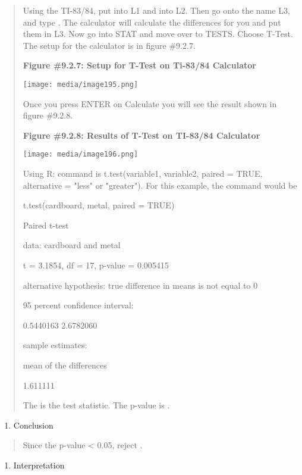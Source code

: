 \documentclass[]{book}
\providecommand{\tightlist}{%
  \setlength{\itemsep}{0pt}\setlength{\parskip}{0pt}}
\begin{document}
\begin{quote}
Using the TI-83/84, put into L1 and into L2. Then go onto the name L3, and type . The calculator will calculate the differences for you and put them in L3. Now go into STAT and move over to TESTS. Choose T-Test. The setup for the calculator is in figure \#9.2.7.

\textbf{Figure \#9.2.7: Setup for T-Test on Ti-83/84 Calculator}

\texttt{[image: media/image195.png]}

Once you press ENTER on Calculate you will see the result shown in figure \#9.2.8.

\textbf{Figure \#9.2.8: Results of T-Test on TI-83/84 Calculator}

\texttt{[image: media/image196.png]}

Using R: command is t.test(variable1, variable2, paired = TRUE, alternative = "less" or "greater"). For this example, the command would be

t.test(cardboard, metal, paired = TRUE)

Paired t-test

data: cardboard and metal

t = 3.1854, df = 17, p-value = 0.005415

alternative hypothesis: true difference in means is not equal to 0

95 percent confidence interval:

0.5440163 2.6782060

sample estimates:

mean of the differences

1.611111

The is the test statistic. The p-value is .
\end{quote}

\begin{enumerate}
\def\labelenumi{\arabic{enumi}.}
\setcounter{enumi}{4}
\tightlist
\item
  Conclusion
\end{enumerate}

\begin{quote}
Since the p-value \textless{} 0.05, reject .
\end{quote}

\begin{enumerate}
\def\labelenumi{\arabic{enumi}.}
\setcounter{enumi}{5}
\tightlist
\item
  Interpretation
\end{enumerate}
\end{document}
